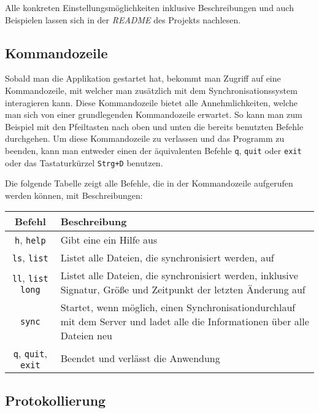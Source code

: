 Alle konkreten Einstellungsmöglichkeiten inklusive Beschreibungen und auch Beispielen lassen sich in der \textit{README} des Projekts nachlesen.

\subsection{Kommandozeile}
\label{sec:command_line}

Sobald man die Applikation gestartet hat, bekommt man Zugriff auf eine Kommandozeile, mit welcher man zusätzlich mit dem Synchronisationssystem interagieren kann.
Diese Kommandozeile bietet alle Annehmlichkeiten, welche man sich von einer grundlegenden Kommandozeile erwartet.
So kann man zum Beispiel mit den Pfeiltasten nach oben und unten die bereits benutzten Befehle durchgehen. 
Um diese Kommandozeile zu verlassen und das Programm zu beenden, kann man entweder einen der äquivalenten Befehle \verb|q|, \verb|quit| oder \verb|exit|
oder das Tastaturkürzel \verb|Strg+D| benutzen.

Die folgende Tabelle zeigt alle Befehle, die in der Kommandozeile aufgerufen werden können, mit Beschreibungen:
\begin{center}
\begin{tabular}{ | c | p{8cm} | }
\hline 
\textbf{Befehl} & \textbf{Beschreibung} \\
\hline \hline
 \verb|h|, \verb|help|              & Gibt eine ein Hilfe aus \\ \hline
 \verb|ls|, \verb|list|             & Listet alle Dateien, die synchronisiert werden, auf \\  \hline
 \verb|ll|, \verb|list long|        & Listet alle Dateien, die synchronisiert werden, 
                                      inklusive Signatur, Größe und Zeitpunkt der letzten Änderung auf \\ \hline
 \verb|sync|                        & Startet, wenn möglich, einen Synchronisationdurchlauf mit dem Server 
                                      und ladet alle die Informationen über alle Dateien neu \\ \hline
 \verb|q|, \verb|quit|, \verb|exit| & Beendet und verlässt die Anwendung \\ \hline
\end{tabular}
\end{center}

\subsection{Protokollierung}
\label{sec:logging}

